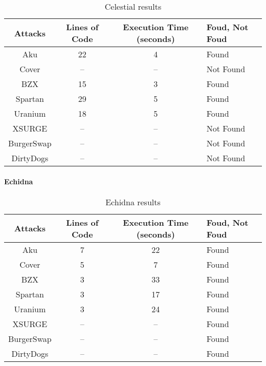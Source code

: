 \begin{center}
    \begin{table*}
        \caption{Celestial results}
            \label{tab:CelestialTable}
                \begin{tabular}{cccl}
                \toprule
                    Attacks & Lines of Code & Execution Time (seconds) & Foud, Not Foud\\
                    \midrule
                    Aku & 22 & 4 & Found\\ 
                    Cover & --  & -- & Not Found \\ 
                    BZX & 15 & 3 & Found\\ 
                    Spartan & 29 &  5 & Found \\ 
                    Uranium & 18 &  5 & Found \\ 
                    XSURGE &  -- & -- & Not Found \\  
                    BurgerSwap &  -- & -- & Not Found\\ 
                    DirtyDogs &  -- & -- & Not Found \\
                \bottomrule
                \end{tabular}
    \end{table*}
        
\end{center}
\paragraph{Echidna}

\begin{center}
    \begin{table*}    
        \caption{Echidna results}
        \label{tab:EchidnaTable}
        \begin{tabular}{cccl}
        \toprule
            Attacks & Lines of Code & Execution Time (seconds) & Foud, Not Foud\\
            \midrule
            Aku & 7 & 22 & Found\\ 
            Cover & 5 & 7 & Found\\ 
            BZX & 3 & 33 & Found \\ 
            Spartan & 3 & 17 & Found  \\ 
            Uranium & 3 & 24 & Found \\ 
            XSURGE & -- & -- & Found \\  
            BurgerSwap &  -- & -- & Found \\ 
            DirtyDogs &  -- & -- & Found \\
        \bottomrule
        \end{tabular}
    \end{table*}
\end{center}

